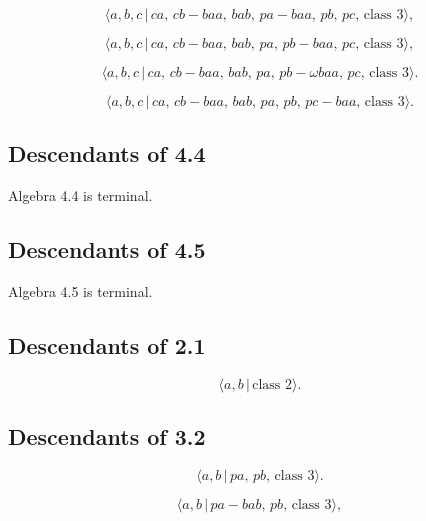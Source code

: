 \documentclass[10pt]{article}
\begin{document}
\begin{equation}
\langle a,b,c\,|\,ca,\,cb-baa,\,bab,\,pa-baa,\,pb,\,pc,\,\text{class }%
3\rangle ,  \tag{5.33}
\end{equation}

\begin{equation}
\langle a,b,c\,|\,ca,\,cb-baa,\,bab,\,pa,\,pb-baa,\,pc,\,\text{class }%
3\rangle ,  \tag{5.34}
\end{equation}

\begin{equation}
\langle a,b,c\,|\,ca,\,cb-baa,\,bab,\,pa,\,pb-\omega baa,\,pc,\,\text{class }%
3\rangle .  \tag{5.35}
\end{equation}

\begin{equation}
\langle a,b,c\,|\,ca,\,cb-baa,\,bab,\,pa,\,pb,\,pc-baa,\,\text{class }%
3\rangle .  \tag{5.36}
\end{equation}

\subsection{Descendants of 4.4}

Algebra 4.4 is terminal.

\subsection{Descendants of 4.5}

Algebra 4.5 is terminal.

\subsection{Descendants of 2.1}

\begin{equation}
\langle a,b\,|\,\text{class }2\rangle .  \tag{5.37}
\end{equation}

\subsection{Descendants of 3.2}

\begin{equation}
\langle a,b\,|\,pa,\,pb,\,\text{class }3\rangle .  \tag{5.38}
\end{equation}

\begin{equation}
\langle a,b\,|\,pa-bab,\,pb,\,\text{class }3\rangle ,  \tag{5.39}
\end{equation}
\end{document}
